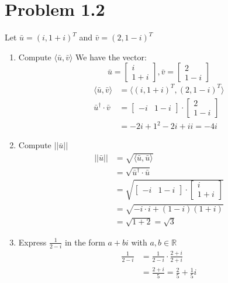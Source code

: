 \documentclass[12pt]{article}
\begin{document}
\section*{Problem 1.2}
Let \(\bar{u} = (i, 1+i)^T\) and \(\bar{v} = (2, 1-i)^T\)
\begin{enumerate}
    \item Compute \(\langle \bar{u}, \bar{v} \rangle\)
    We have the vector:
    \[\bar{u} = \begin{bmatrix}
        i \\
        1+i
    \end{bmatrix},
    \bar{v} = \begin{bmatrix}
        2 \\
        1-i
    \end{bmatrix}
    \]
    \begin{align*}
        \langle \bar{u}, \bar{v} \rangle &= \langle (i, 1+i)^T, (2, 1-i)^T \rangle \\
        \bar{u}^\dagger \cdot \bar{v} &= 
        \begin{bmatrix}
            -i & 1-i    
        \end{bmatrix}
        \cdot 
        \begin{bmatrix}
            2 \\
            1-i
        \end{bmatrix}\\
        &= -2i + 1^2 -2i + ii = -4i 
    \end{align*}
    \item Compute \(||\bar{u}||\)
    \begin{align*}
        ||\bar{u}|| &= \sqrt{\langle \bar{u}, \bar{u} \rangle} \\
        &= \sqrt{\bar{u}^\dagger \cdot \bar{u}} \\
        &= \sqrt{\begin{bmatrix}
            -i & 1-i
        \end{bmatrix}
        \cdot
        \begin{bmatrix}
            i \\
            1+i
        \end{bmatrix}} \\
        &= \sqrt{-i \cdot i + (1-i)(1+i)} \\
        &= \sqrt{1 + 2} = \sqrt{3}
    \end{align*}
    \item Express \(\frac{1}{2-i}\) in the form \(a+bi\) with \(a, b \in \mathbb{R}\)
    \begin{align*}
        \frac{1}{2-i} &= \frac{1}{2-i} \cdot \frac{2+i}{2+i} \\
        &= \frac{2+i}{5} = \frac{2}{5} + \frac{1}{5}i
    \end{align*}
\end{enumerate}
\end{document}
